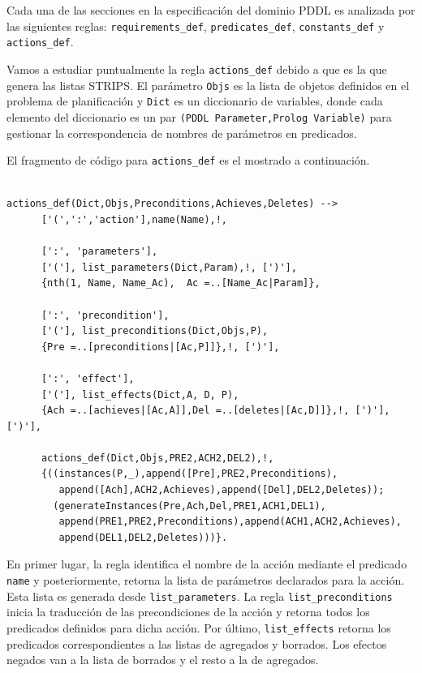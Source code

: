 Cada una de las secciones en la especificaci\'on del dominio PDDL es
analizada por las si\-guien\-tes
reglas: \texttt{requirements\_def}, \texttt{predicates\_def},
\texttt{constants\_def} y \texttt{actions\_def}.

Vamos a estudiar puntualmente la regla \texttt{actions\_def} debido a
que es la que genera las listas STRIPS. El par\'ametro \texttt{Objs}
es la lista de objetos definidos en el problema de planificaci\'on
y \texttt{Dict} es un diccionario de variables, donde cada elemento
del diccionario es un par \texttt{(PDDL
Parameter,Prolog Variable)} para gestionar la correspondencia de
nombres de par\'ametros en predicados. 

El fragmento de c\'odigo para \texttt{actions\_def} es el mostrado a
continuaci\'on.
\ \\

\ \\

        \begin{verbatim}
actions_def(Dict,Objs,Preconditions,Achieves,Deletes) --> 
      ['(',':','action'],name(Name),!, 

      [':', 'parameters'], 
      ['('], list_parameters(Dict,Param),!, [')'],
      {nth(1, Name, Name_Ac),  Ac =..[Name_Ac|Param]},

      [':', 'precondition'], 
      ['('], list_preconditions(Dict,Objs,P),
      {Pre =..[preconditions|[Ac,P]]},!, [')'],
 
      [':', 'effect'], 
      ['('], list_effects(Dict,A, D, P),
      {Ach =..[achieves|[Ac,A]],Del =..[deletes|[Ac,D]]},!, [')'], [')'],

      actions_def(Dict,Objs,PRE2,ACH2,DEL2),!,
      {((instances(P,_),append([Pre],PRE2,Preconditions),
         append([Ach],ACH2,Achieves),append([Del],DEL2,Deletes));
        (generateInstances(Pre,Ach,Del,PRE1,ACH1,DEL1),
         append(PRE1,PRE2,Preconditions),append(ACH1,ACH2,Achieves), 
         append(DEL1,DEL2,Deletes)))}.
        \end{verbatim}


En primer lugar, la regla identifica el nombre de la acci\'on 
mediante el predicado \texttt{name} y pos\-te\-rior\-men\-te,
retorna la lista de par\'ametros declarados para la acci\'on. 
Esta lista es generada desde \texttt{list\_parameters}. 
La regla \texttt{list\_preconditions} inicia la traducci\'on de las
precondiciones de la acci\'on y retorna todos los predicados definidos
para dicha acci\'on. Por \'ultimo, \texttt{list\_effects} retorna los predicados
correspondientes a las listas de agregados y borrados. 
Los efectos negados van a la lista de
borrados y el resto a la de agregados.

